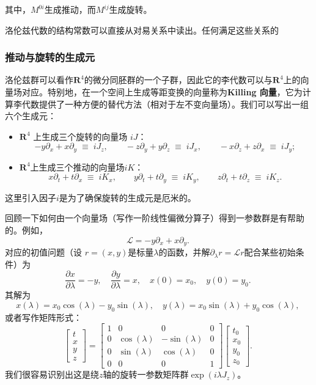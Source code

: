 其中，$M^{0i}$生成推动，而$M^{ij}$生成旋转。

洛伦兹代数的结构常数可以直接从对易关系中读出。任何满足这些关系的
\subsubsection{推动与旋转的生成元}
洛伦兹群可以看作$\mathbf{R}^{4}$的微分同胚群的一个子群，因此它的李代数可以与$\mathbf{R}^{4}$上的向量场对应。特别地，在一个空间上生成等距变换的向量称为\textbf{Killing 向量}，它为计算李代数提供了一种方便的替代方法（相对于左不变向量场）。我们可以写出一组六个生成元：
\begin{itemize}
\item $\mathbf{R}^{4}$ 上生成三个旋转的向量场 $iJ$：
\[
-y\partial_{x} + x\partial_{y} \;\equiv\; iJ_{z}, \qquad
-z\partial_{y} + y\partial_{z} \;\equiv\; iJ_{x}, \qquad
-x\partial_{z} + z\partial_{x} \;\equiv\; iJ_{y};~
\]
\item $\mathbf{R}^{4}$上生成三个推动的向量场$iK$：
\[
x\partial_{t} + t\partial_{x} \;\equiv\; iK_{x}, \qquad
y\partial_{t} + t\partial_{y} \;\equiv\; iK_{y}, \qquad
z\partial_{t} + t\partial_{z} \;\equiv\; iK_{z}.~
\]
\end{itemize}
这里引入因子$i$是为了确保旋转的生成元是厄米的。

回顾一下如何由一个向量场（写作一阶线性偏微分算子）得到一参数群是有帮助的。例如，
\[
\mathcal{L} = -y\partial_{x} + x\partial_{y}.~
\]
对应的初值问题（设 $r = (x,y)$是标量$\lambda$的函数，并解$\partial_{\lambda} r = \mathcal{L}r$配合某些初始条件）为
\[
\frac{\partial x}{\partial \lambda} = -y, 
\quad \frac{\partial y}{\partial \lambda} = x,
\quad x(0) = x_{0}, 
\quad y(0) = y_{0}.~
\]
其解为
\[
x(\lambda) = x_{0}\cos(\lambda) - y_{0}\sin(\lambda), 
\quad y(\lambda) = x_{0}\sin(\lambda) + y_{0}\cos(\lambda),~
\]
或者写作矩阵形式：
\[
\begin{bmatrix}
t \\ x \\ y \\ z
\end{bmatrix}
=
\begin{bmatrix}
1 & 0 & 0 & 0 \\
0 & \cos(\lambda) & -\sin(\lambda) & 0 \\
0 & \sin(\lambda) & \cos(\lambda) & 0 \\
0 & 0 & 0 & 1
\end{bmatrix}
\begin{bmatrix}
t_{0} \\ x_{0} \\ y_{0} \\ z_{0}
\end{bmatrix}.~
\]
我们很容易识别出这是绕$z$轴的旋转一参数矩阵群$\exp(i\lambda J_{z})$。

